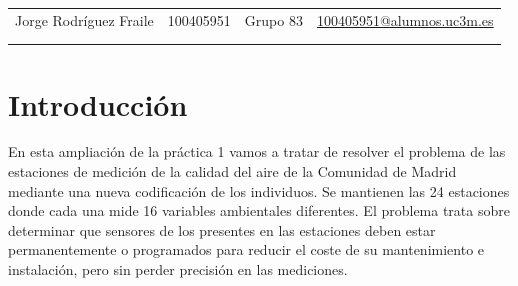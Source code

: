 \documentclass[12pt, spanish, pdftex]{UC3M_document}
\author{Jorge Rodríguez Fraile}
\begin{document}
\begin{titlepage}
	
	\begin{table}[b]
		\centering
		\begin{tabular}{ cccc }
			\large Jorge Rodríguez Fraile & \large 100405951 & \large Grupo 83 & \href{mailto:100405951@alumnos.uc3m.es}{\large 100405951@alumnos.uc3m.es} \\
			                              &                  &                 &                                                                           \\
			                              &                  &                 &                                                                           \\
		\end{tabular}
	\end{table}
	
\end{titlepage}

\newpage

\begin{spacing}{0.5}
	\hypersetup{linkcolor=black}    %
	\tableofcontents\newpage        %
	\listoffigures\newpage          %
	\listoftables\newpage           %
\end{spacing}


\section{Introducción}
En esta ampliación de la práctica 1 vamos a tratar de resolver el problema de las estaciones de medición de la calidad del aire de la Comunidad de Madrid mediante una nueva codificación de los individuos. Se mantienen las 24 estaciones donde cada una mide 16 variables ambientales diferentes. El problema trata sobre determinar que sensores de los presentes en las estaciones deben estar permanentemente o programados para reducir el coste de su mantenimiento e instalación, pero sin perder precisión en las mediciones.
\end{document}
